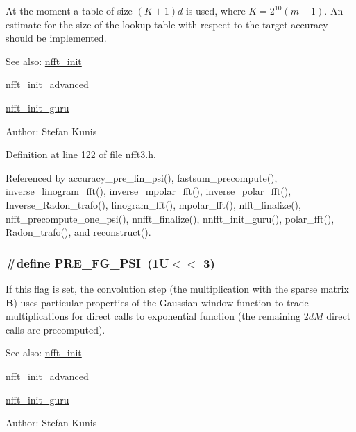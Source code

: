 At the moment a table of size $(K+1)d$ is used, where $K=2^{10}(m+1)$. An estimate for the size of the lookup table with respect to the target accuracy should be implemented.

\begin{Desc}
\item[See also:]\hyperlink{group__nfft_ga7}{nfft\_\-init} 

\hyperlink{group__nfft_ga8}{nfft\_\-init\_\-advanced} 

\hyperlink{group__nfft_ga9}{nfft\_\-init\_\-guru} \end{Desc}
\begin{Desc}
\item[Author:]Stefan Kunis \end{Desc}


Definition at line 122 of file nfft3.h.

Referenced by accuracy\_\-pre\_\-lin\_\-psi(), fastsum\_\-precompute(), inverse\_\-linogram\_\-fft(), inverse\_\-mpolar\_\-fft(), inverse\_\-polar\_\-fft(), Inverse\_\-Radon\_\-trafo(), linogram\_\-fft(), mpolar\_\-fft(), nfft\_\-finalize(), nfft\_\-precompute\_\-one\_\-psi(), nnfft\_\-finalize(), nnfft\_\-init\_\-guru(), polar\_\-fft(), Radon\_\-trafo(), and reconstruct().\hypertarget{group__nfft_ga19}{
\subsubsection[PRE\_\-FG\_\-PSI]{\setlength{\rightskip}{0pt plus 5cm}\#define PRE\_\-FG\_\-PSI~(1U$<$$<$ 3)}}
\label{group__nfft_ga19}


If this flag is set, the convolution step (the multiplication with the sparse matrix $\mathbf{B}$) uses particular properties of the Gaussian window function to trade multiplications for direct calls to exponential function (the remaining $2dM$ direct calls are precomputed). 

\begin{Desc}
\item[See also:]\hyperlink{group__nfft_ga7}{nfft\_\-init} 

\hyperlink{group__nfft_ga8}{nfft\_\-init\_\-advanced} 

\hyperlink{group__nfft_ga9}{nfft\_\-init\_\-guru} \end{Desc}
\begin{Desc}
\item[Author:]Stefan Kunis \end{Desc}


